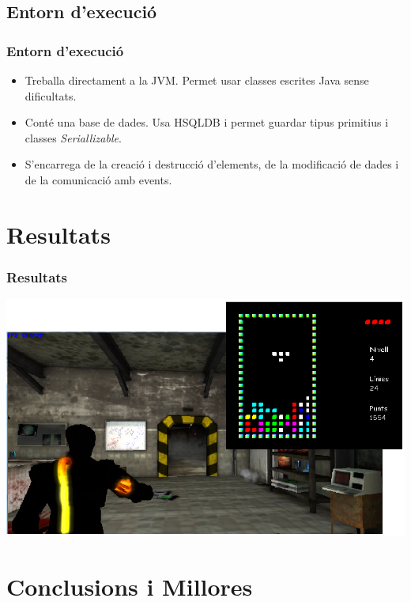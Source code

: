 \documentclass[serif,9pt]{beamer}
\begin{document}
  \subsection{Entorn d'execució}
    
    \begin{frame}\frametitle{Entorn d'execució}
      \begin{itemize}
        \item Treballa directament a la JVM. Permet usar classes escrites Java sense dificultats.\bigskip
        \item Conté una base de dades. Usa HSQLDB i permet guardar tipus primitius i classes {\em Seriallizable}.\bigskip
        \item S'encarrega de la creació i destrucció d'elements, de la modificació de dades i de la comunicació amb events.
      \end{itemize}
    \end{frame}

\section{Resultats}

  \begin{frame}\frametitle{Resultats}
    \includegraphics[width=1.00\textwidth]{./img/Screens.png}
  \end{frame}

\section{Conclusions i Millores}
\end{document}
